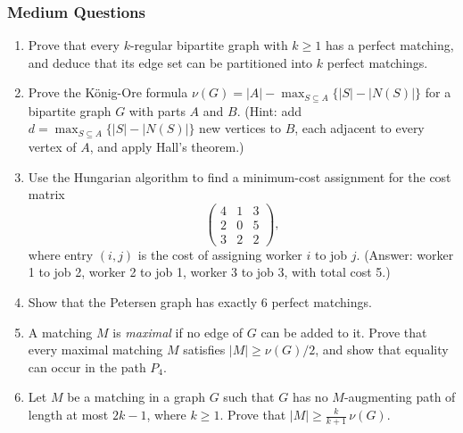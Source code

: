 \documentclass{article}
\theoremstyle{definition}
\begin{document}
\subsubsection{Medium Questions}
\begin{enumerate}[start=8]
\item\label{q:regular-bipartite-pm} Prove that every $k$-regular bipartite graph with $k \geq 1$ has a perfect matching, and deduce that its edge set can be partitioned into $k$ perfect matchings.

\item Prove the König-Ore formula $\nu(G) = |A| - \max_{S \subseteq A}\{|S| - |N(S)|\}$ for a bipartite graph $G$ with parts $A$ and $B$. (Hint: add $d = \max_{S \subseteq A}\{|S| - |N(S)|\}$ new vertices to $B$, each adjacent to every vertex of $A$, and apply Hall's theorem.)

\item Use the Hungarian algorithm to find a minimum-cost assignment for the cost matrix
\[
\begin{pmatrix} 4 & 1 & 3 \\ 2 & 0 & 5 \\ 3 & 2 & 2 \end{pmatrix},
\]
where entry $(i,j)$ is the cost of assigning worker $i$ to job $j$. (Answer: worker 1 to job 2, worker 2 to job 1, worker 3 to job 3, with total cost 5.)

\item Show that the Petersen graph has exactly 6 perfect matchings.

\item A matching $M$ is \emph{maximal} if no edge of $G$ can be added to it. Prove that every maximal matching $M$ satisfies $|M| \geq \nu(G)/2$, and show that equality can occur in the path $P_4$.

\item Let $M$ be a matching in a graph $G$ such that $G$ has no $M$-augmenting path of length at most $2k-1$, where $k \geq 1$. Prove that $|M| \geq \frac{k}{k+1}\,\nu(G)$.
\end{enumerate}
\end{document}
